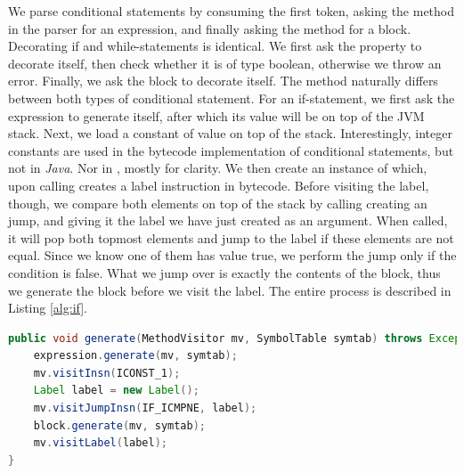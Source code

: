 We parse conditional statements by consuming the first token, asking the  method in the parser for an expression, and finally asking the  method for a block. Decorating if and while-statements is identical. We first ask the  property to decorate itself, then check whether it is of type boolean, otherwise we throw an error. Finally, we ask the block to decorate itself. The  method naturally differs between both types of conditional statement. For an if-statement, we first ask the expression to generate itself, after which its value will be on top of the JVM stack. Next, we load a constant of value  on top of the stack. Interestingly, integer constants are used in the bytecode implementation of conditional statements, but not in \emph{Java}. Nor in , mostly for clarity. We then create an instance of  which, upon calling  creates a label instruction in bytecode. Before visiting the label, though, we compare both elements on top of the stack by calling creating an  jump, and giving it the label we have just created as an argument. When called, it will pop both topmost elements and jump to the label if these elements are not equal. Since we know one of them has value true, we perform the jump only if the condition is false. What we jump over is exactly the contents of the block, thus we generate the block before we visit the label. The entire process is described in Listing \ref{alg:if}.

\begin{lstlisting}[language=Java,caption={Generating If-Statements.},label={alg:if}]
public void generate(MethodVisitor mv, SymbolTable symtab) throws Exception {
	expression.generate(mv, symtab);
	mv.visitInsn(ICONST_1);
	Label label = new Label();
	mv.visitJumpInsn(IF_ICMPNE, label);
	block.generate(mv, symtab);
	mv.visitLabel(label);
}
\end{lstlisting}

